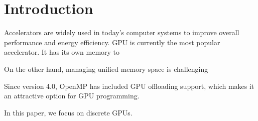 \section{Introduction}
\label{sect:intro}

Accelerators are widely used in today's computer systems to improve overall performance and energy efficiency.
GPU is currently the most popular accelerator.
It has its own memory to 

On the other hand, managing unified memory space is challenging 

Since version 4.0, OpenMP has included GPU offloading support, which makes it an attractive option for GPU programming.

In this paper, we focus on discrete GPUs.

